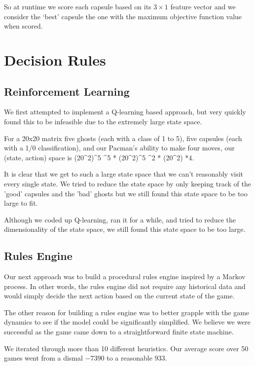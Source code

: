 \documentclass[11pt, oneside]{article}   	%
\begin{document}
So at runtime we score each capsule based on its $3\times1$ feature vector and we consider the `best' capsule the one with the maximum objective function value when scored.

\section{Decision Rules}

\subsection{Reinforcement Learning}
We first attempted to implement a Q-learning based approach, but very quickly found this to be infeasible due to the extremely large state space.

For a 20x20 matrix five ghosts (each with a class of 1 to 5), five capsules (each with a 1/0 classification), and our Pacman's ability to make four moves, our (state, action) space is (20^2)^5 ^5 * (20^2)^5 ^2 * (20^2) *4.

It is clear that we get to such a large state space that we can't reasonably visit every single state. We tried to reduce the state space by only keeping track of the 'good' capsules and the 'bad' ghosts but we still found this state space to be too large to fit. 

Although we coded up Q-learning, ran it for a while, and tried to reduce the dimensionality of the state space, we still found this state space to be too large.

\subsection{Rules Engine}
Our next approach was to build a procedural rules engine inspired by a Markov process. In other words, the rules engine did not require any historical data and would simply decide the next action based on the current state of the game.

The other reason for building a rules engine was to better grapple with the game dynamics to see if the model could be significantly simplified. We believe we were successful as the game came down to a straightforward finite state machine. 

We iterated through more than 10 different heuristics. Our average score over 50 games went from a dismal $-7390$ to a reasonable $933$.
\end{document}

